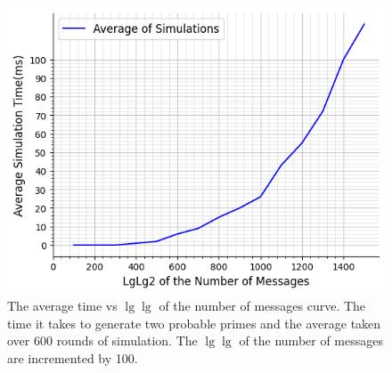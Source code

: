 \begin{figure}
	\includegraphics*[height = 0.4 \textheight]{graphic/time50.png}
	\caption{The average time vs \(\lg \lg \) of the number of messages curve. The time it takes to generate two probable primes and the average taken over 600 rounds of simulation. The \(\lg \lg \) of the number of messages are incremented by 100.}
\end{figure}
